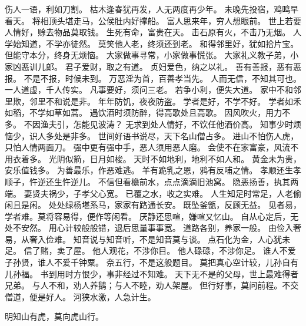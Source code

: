 \documentclass[12pt,UTF8]{ctexbook}
\begin{document}
伤人一语，利如刀割。
枯木逢春犹再发，人无两度再少年。
未晚先投宿，鸡鸣早看天。
将相顶头堪走马，公侯肚内好撑船。
富人思来年，穷人想眼前。
世上若要人情好，赊去物品莫取钱。
生死有命，富贵在天。
击石原有火，不击乃无烟。
人学始知道，不学亦徒然。
莫笑他人老，终须还到老。
和得邻里好，犹如拾片宝。
但能守本分，终身无烦恼。
大家做事寻常，小家做事慌张。
大家礼义教子弟，小家凶恶训儿郎。
君子爱财，取之有道。
贞妇爱色，纳之以礼。
善有善报，恶有恶报。
不是不报，时候未到。
万恶淫为首，百善孝当先。
人而无信，不知其可也。
一人道虚，千人传实。
凡事要好，须问三老。
若争小利，便失大道。
家中不和邻里欺，邻里不和说是非。
年年防饥，夜夜防盗。
学者是好，不学不好。
学者如禾如稻，不学如草如蒿。
遇饮酒时须防醉，得高歌处且高歌。
因风吹火，用力不多。
不因渔夫引，怎能见波涛？
无求到处人情好，不饮任他酒价高。
知事少时烦恼少，识人多处是非多。
世间好语书说尽，天下名山僧占多。
进山不怕伤人虎，只怕人情两面刀。
强中更有强中手，恶人须用恶人磨。
会使不在家富豪，风流不用衣着多。
光阴似箭，日月如梭。
天时不如地利，地利不如人和。
黄金未为贵，安乐值钱多。
为善最乐，作恶难逃。
羊有跪乳之恩，鸦有反哺之情。
孝顺还生孝顺子，忤逆还生忤逆儿。
不信但看檐前水，点点滴滴旧池窝。
隐恶扬善，执其两端。
妻贤夫祸少，子孝父心宽。
已覆之水，收之实难。
人生知足时常足，人老偷闲且是闲。
处处绿杨堪系马，家家有路通长安。
既坠釜甑，反顾无益。
见者易，学者难。莫将容易得，便作等闲看。
厌静还思喧，嫌喧又忆山。
自从心定后，无处不安然。
用心计较般般错，退后思量事事宽。
道路各别，养家一般。
由俭入奢易，从奢入俭难。
知音说与知音听，不是知音莫与谈。
点石化为金，人心犹未足。
信了赌，卖了屋。
他人观花，不涉你目。
他人碌碌，不涉你足。
谁人不爱子孙贤，谁人不爱千钟粟。
奈五行，不是这般题目。
莫把真心空计较，儿孙自有儿孙福。
书到用时方恨少，事非经过不知难。
天下无不是的父母，世上最难得者兄弟。
与人不和，劝人养鹅；与人不睦，劝人架屋。
但行好事，莫问前程。不交僧道，便是好人。
河狭水激，人急计生。

明知山有虎，莫向虎山行。
\end{document}
